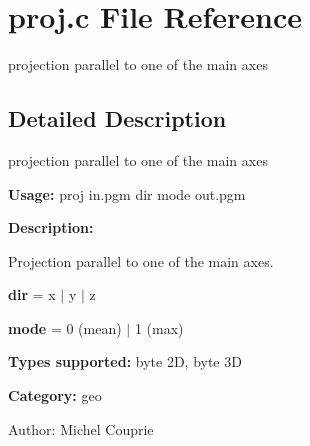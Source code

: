 \section{proj.c File Reference}
\label{proj_8c}
projection parallel to one of the main axes  




\label{_details}
\subsection{Detailed Description}
projection parallel to one of the main axes 

{\bf Usage:} proj in.pgm dir mode out.pgm

{\bf Description:}

Projection parallel to one of the main axes.

{\bf dir} = x $|$ y $|$ z

{\bf mode} = 0 (mean) $|$ 1 (max)

{\bf Types supported:} byte 2D, byte 3D

{\bf Category:} geo

\begin{Desc}
\item[Author:]Michel Couprie \end{Desc}
